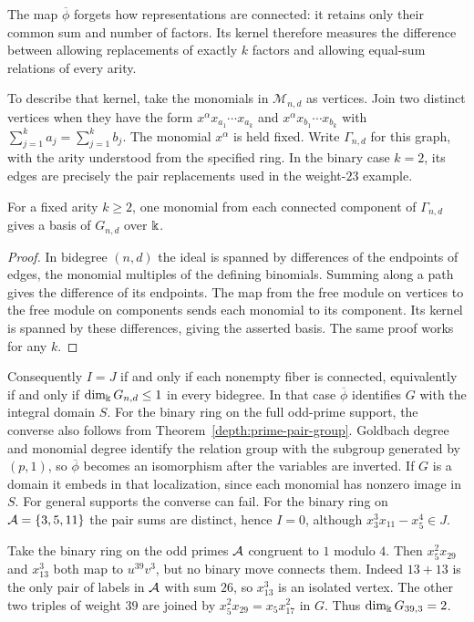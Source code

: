 The map $\overline\phi$ forgets how representations are connected:
it retains only their common sum and number of factors. Its kernel
therefore measures the difference between allowing replacements of
exactly $k$ factors and allowing equal-sum relations of every arity.

To describe that kernel, take the monomials in $\mathcal M_{n,d}$ as
vertices. Join two distinct vertices when they have the form
$x^\alpha x_{a_1}\cdots x_{a_k}$ and
$x^\alpha x_{b_1}\cdots x_{b_k}$ with
$\sum_{j=1}^k a_j=\sum_{j=1}^k b_j$. The monomial $x^\alpha$ is
held fixed. Write $\Gamma_{n,d}$ for this graph, with the arity
understood from the specified ring. In the binary case $k=2$, its
edges are precisely the pair replacements used in the weight-$23$
example.

\begin{proposition}
\label{setup:components}
For a fixed arity $k\ge2$, one monomial from each connected
component of $\Gamma_{n,d}$ gives a basis of $G_{n,d}$ over $\Bbbk$.
\end{proposition}
\begin{proof}
In bidegree $(n,d)$ the ideal is spanned by differences of the
endpoints of edges, the monomial multiples of the defining
binomials. Summing along a path gives the difference of its endpoints.
The map from the free module on vertices to the free module on
components sends each monomial to its component. Its kernel is
spanned by these differences, giving the asserted basis. The same
proof works for any $k$.
\end{proof}

Consequently $I=J$ if and only if each nonempty fiber is connected,
equivalently if and only if $\dim_\Bbbk G_{n,d}\le1$ in every
bidegree. In that case $\overline\phi$ identifies $G$ with the
integral domain $S$. For the binary ring on the full odd-prime support, the converse
also follows from Theorem~\ref{depth:prime-pair-group}. Goldbach degree and
monomial degree identify the relation group with the subgroup generated by
$(p,1)$, so $\overline\phi$ becomes an isomorphism after the variables
are inverted. If $G$ is a domain it embeds in that
localization, since each monomial has nonzero image in $S$.
For general supports the converse can fail. For the binary ring on $\mathcal A=\{3,5,11\}$
the pair sums are distinct, hence $I=0$, although
$x_3^3x_{11}-x_5^4\in J$.

\begin{example}
Take the binary ring on the odd primes $\mathcal A$ congruent to $1$ modulo $4$. Then
$x_5^2x_{29}$ and $x_{13}^3$ both map to $u^{39}v^3$, but no
binary move connects them. Indeed $13+13$ is the only pair of
labels in $\mathcal A$ with sum $26$, so $x_{13}^3$ is an isolated vertex.
The other two triples of weight $39$ are joined by
$x_5^2x_{29}=x_5x_{17}^2$ in $G$. Thus $\dim_\Bbbk G_{39,3}=2$.
\end{example}

